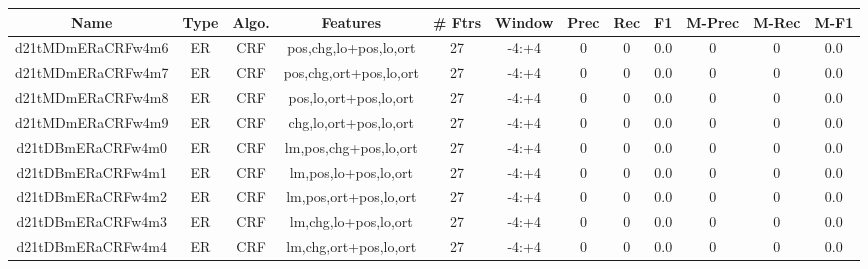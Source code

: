\documentclass[a4paper]{article}
\begin{document}
\begin{landscape}
\begin{center}
\begin{tabular}{ |c|c|c|c|c|c|c|c|c|c|c|c|}
 \hline
\end{tabular}
\end{center}




\begin{center}
\begin{tabular}{ |c|c|c|c|c|c|c|c|c|c|c|c|} 
 \hline
 	Name & Type & Algo. & Features & \# Ftrs & Window & Prec & Rec & F1 & M-Prec & M-Rec & M-F1\\
 \hline

 	

 
 	
 	\small{ d21tMDmERaCRFw4m6 } & ER & CRF & pos,chg,lo+pos,lo,ort  &  27 &  -4:+4  &  0 & 0 & 0.0  &  0 & 0 & 0.0 \\
 	

 
 	
 	\small{ d21tMDmERaCRFw4m7 } & ER & CRF & pos,chg,ort+pos,lo,ort  &  27 &  -4:+4  &  0 & 0 & 0.0  &  0 & 0 & 0.0 \\
 	

 
 	
 	\small{ d21tMDmERaCRFw4m8 } & ER & CRF & pos,lo,ort+pos,lo,ort  &  27 &  -4:+4  &  0 & 0 & 0.0  &  0 & 0 & 0.0 \\
 	

 
 	
 	\small{ d21tMDmERaCRFw4m9 } & ER & CRF & chg,lo,ort+pos,lo,ort  &  27 &  -4:+4  &  0 & 0 & 0.0  &  0 & 0 & 0.0 \\
 	

 
 	
 	\small{ d21tDBmERaCRFw4m0 } & ER & CRF & lm,pos,chg+pos,lo,ort  &  27 &  -4:+4  &  0 & 0 & 0.0  &  0 & 0 & 0.0 \\
 	

 
 	
 	\small{ d21tDBmERaCRFw4m1 } & ER & CRF & lm,pos,lo+pos,lo,ort  &  27 &  -4:+4  &  0 & 0 & 0.0  &  0 & 0 & 0.0 \\
 	

 
 	
 	\small{ d21tDBmERaCRFw4m2 } & ER & CRF & lm,pos,ort+pos,lo,ort  &  27 &  -4:+4  &  0 & 0 & 0.0  &  0 & 0 & 0.0 \\
 	

 
 	
 	\small{ d21tDBmERaCRFw4m3 } & ER & CRF & lm,chg,lo+pos,lo,ort  &  27 &  -4:+4  &  0 & 0 & 0.0  &  0 & 0 & 0.0 \\
 	

 
 	
 	\small{ d21tDBmERaCRFw4m4 } & ER & CRF & lm,chg,ort+pos,lo,ort  &  27 &  -4:+4  &  0 & 0 & 0.0  &  0 & 0 & 0.0 \\
 	


\end{tabular}
\end{center}
\end{landscape}
\end{document}
